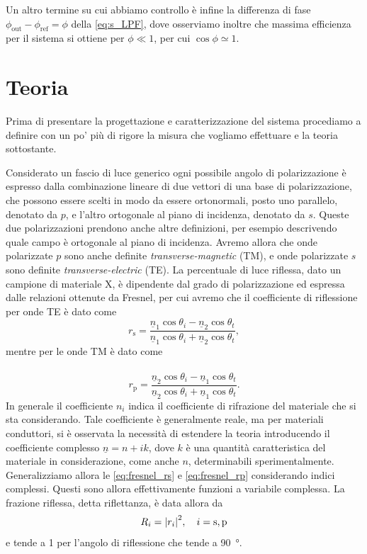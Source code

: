 \documentclass[prb,showpacs,floatfix,altaffilletter,amsmath,amssymb,reprint,citeautoscript]{revtex4-1}
\begin{document}
Un altro termine su cui abbiamo controllo è infine la differenza di fase $\phi_\mathrm{out} - \phi_\mathrm{ref} = \phi$ della \eqref{eq:s_LPF}, dove osserviamo inoltre che massima efficienza per il sistema si ottiene per $\phi\ll 1$, per cui $\cos\phi\simeq1$.

\section{Teoria}

Prima di presentare la progettazione e caratterizzazione del sistema procediamo a definire con un po' più di rigore la misura che vogliamo effettuare e la teoria sottostante. 

Considerato un fascio di luce generico ogni possibile angolo di polarizzazione è espresso dalla combinazione lineare di due vettori di una base di polarizzazione, che possono essere scelti in modo da essere ortonormali, posto uno parallelo, denotato da $p$, e l'altro ortogonale al piano di incidenza, denotato da $s$. Queste due polarizzazioni prendono anche altre definizioni, per esempio descrivendo quale campo è ortogonale al piano di incidenza. Avremo allora che onde polarizzate $p$ sono anche definite \emph{transverse-magnetic} (TM), e onde polarizzate $s$ sono definite \emph{transverse-electric} (TE). La percentuale di luce riflessa, dato un campione di materiale X, è dipendente dal grado di polarizzazione ed espressa dalle relazioni ottenute da Fresnel\cite{fresnelCalculationTintsThat2021,fresnelNoteCalculTeintes1821}, per cui avremo che il coefficiente di riflessione per onde TE è dato come \begin{equation}
    r_\mathrm{s} = \frac{\underline{n}_1\cos\theta_i - \underline{n}_2\cos\theta_t}{\underline{n}_1\cos\theta_i + \underline{n}_2\cos\theta_t},
    \label{eq:fresnel_rs}
\end{equation} mentre per le onde TM è dato come \paragraph*{}\begin{equation}
    r_\mathrm{p} = \frac{\underline{n}_2\cos\theta_i - \underline{n}_1\cos\theta_t}{\underline{n}_2\cos\theta_i + \underline{n}_1\cos\theta_t}. 
    \label{eq:fresnel_rp}
\end{equation} In generale il coefficiente $n_i$ indica il coefficiente di rifrazione del materiale che si sta considerando. Tale coefficiente è generalmente reale, ma per materiali conduttori, si è osservata la necessità di estendere la teoria\cite{attwoodSoftXRaysExtreme1999} introducendo il coefficiente complesso $\underline n = n + ik$, dove $k$ è una quantità caratteristica del materiale in considerazione, come anche $n$, determinabili sperimentalmente. Generalizziamo allora le \eqref{eq:fresnel_rs} e \eqref{eq:fresnel_rp} considerando indici complessi. Questi sono allora effettivamente funzioni a variabile complessa. La frazione riflessa, detta riflettanza, è data allora da \begin{equation}
    R_i= \qty|r_i|^2, \quad i = \mathrm{s,p}
\end{equation} e tende a 1 per l'angolo di riflessione che tende a \SI{90}{\degree}.
\end{document}
